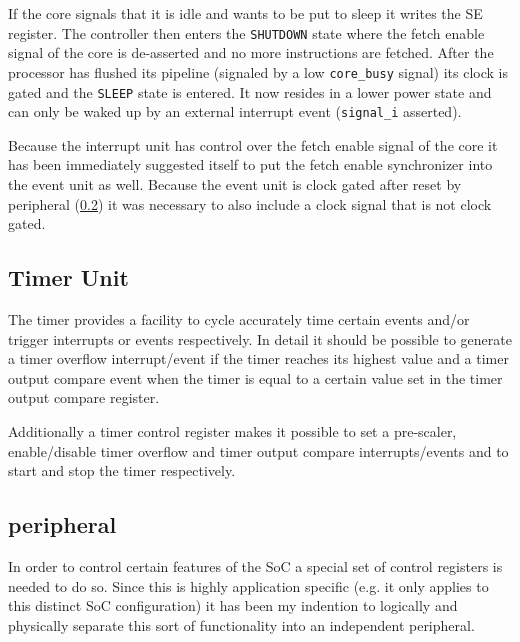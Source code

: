 If the core signals that it is idle and wants to be put to sleep it writes the SE register. The controller then enters the \verb+SHUTDOWN+ state where the fetch enable signal of the core is de-asserted and no more instructions are fetched. After the processor has flushed its pipeline (signaled by a low \verb+core_busy+ signal) its clock is gated and the \verb+SLEEP+ state is entered. It now resides in a lower power state and can only be waked up by an external interrupt event (\verb+signal_i+ asserted).

Because the interrupt unit has control over the fetch enable signal of the core it has been immediately suggested itself to put the fetch enable synchronizer into the event unit as well. Because the event unit is clock gated after reset by \pulpino peripheral (\ref{subsec:pulpino_peripheral}) it was necessary to also include a clock signal that is not clock gated.

\subsection{Timer Unit}

The timer provides a facility to cycle accurately time certain events and/or trigger interrupts or events respectively. In detail it should be possible to generate a timer overflow interrupt/event if the timer reaches its highest value and a timer output compare event when the timer is equal to a certain value set in the timer output compare register.


Additionally a timer control register makes it possible to set a pre-scaler, enable/disable timer overflow and timer output compare interrupts/events and to start and stop the timer respectively.

\subsection{\pulpino peripheral}
\label{subsec:pulpino_peripheral}

In order to control certain features of the SoC a special set of control registers is needed to do so. Since this is highly application specific (e.g. it only applies to this distinct SoC configuration) it has been my indention to logically and physically separate this sort of functionality into an independent peripheral.

